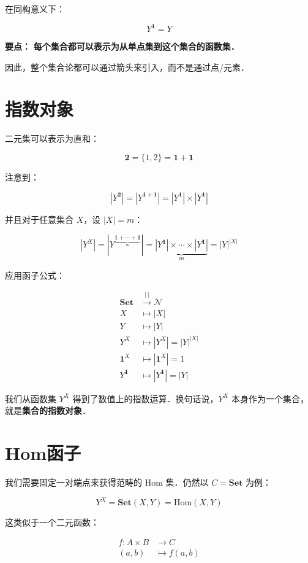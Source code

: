 \documentclass[10pt, openany]{book}
\begin{document}
在同构意义下：

$$
Y^{\mathbf{1}} = Y
$$

\textbf{要点：}
\textbf{每个集合都可以表示为从单点集到这个集合的函数集．}

因此，整个集合论都可以通过箭头来引入，而不是通过点/元素．

\section{指数对象}

二元集可以表示为直和：

$$
\mathbf{2} = \{1,2\} = \mathbf{1} + \mathbf{1}
$$

注意到：

$$
|Y^{\mathbf{2}}| = |Y^{\mathbf{1} + \mathbf{1}}| = |Y^{\mathbf{1}}| \times |Y^{\mathbf{1}}|
$$

并且对于任意集合 $X$，设 $|X| = m$：

$$
|Y^X| = |Y^{\underbrace{\mathbf{1} + \cdots + \mathbf{1}}_{m}}| = \underbrace{|Y^{\mathbf{1}}| \times \cdots \times |Y^{\mathbf{1}}|}_{m} = |Y|^{|X|}
$$

应用函子公式：

$$
\begin{aligned}
\textbf{Set} &\stackrel{|\cdot|}{\longrightarrow} \mathcal{N} \\
X &\mapsto |X| \\
Y &\mapsto |Y| \\
Y^X &\mapsto |Y^X| = |Y|^{|X|} \\
\mathbf{1}^X &\mapsto |\mathbf{1}^X| = 1 \\
Y^{\mathbf{1}} &\mapsto |Y^{\mathbf{1}}| = |Y|
\end{aligned}
$$

我们从函数集 $Y^X$ 得到了数值上的指数运算．换句话说，$Y^X$ 本身作为一个集合，就是\textbf{集合的指数对象}．

\section{Hom函子}

我们需要固定一对端点来获得范畴的 Hom 集．仍然以 $C = \textbf{Set}$ 为例：

$$
Y^X = \textbf{Set}(X,Y) = \text{Hom}(X,Y)
$$

这类似于一个二元函数：

$$
\begin{aligned}
f: A \times B &\to C \\
(a,b) &\mapsto f(a,b)
\end{aligned}
$$
\end{document}

